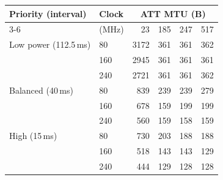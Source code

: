 \begin{tabular}{llrrrr}
\toprule
Priority (interval) & Clock & \multicolumn{4}{c}{ATT MTU (B)} \\
\cmidrule(lr){3-6}
 & (MHz) & 23 & 185 & 247 & 517 \\
\midrule
Low power (112.5\,ms) & 80 & 3172 & 361 & 361 & 362 \\
 & 160 & 2945 & 361 & 361 & 361 \\
 & 240 & 2721 & 361 & 361 & 362 \\
\addlinespace
Balanced (40\,ms) & 80 & 839 & 239 & 239 & 279 \\
 & 160 & 678 & 159 & 199 & 199 \\
 & 240 & 560 & 159 & 158 & 159 \\
\addlinespace
High (15\,ms) & 80 & 730 & 203 & 188 & 188 \\
 & 160 & 518 & 143 & 143 & 129 \\
 & 240 & 444 & 129 & 128 & 128 \\
\bottomrule
\end{tabular}
